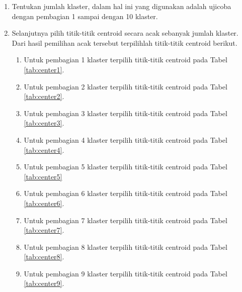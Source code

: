 \begin{enumerate}
	\item Tentukan jumlah klaster, dalam hal ini yang digunakan adalah ujicoba dengan pembagian 1 sampai dengan 10 klaster.
	\item Selanjutnya pilih titik-titik centroid secara acak sebanyak jumlah klaster. Dari hasil pemilihan acak tersebut terpilihlah titik-titik centroid berikut.
	
	\begin{enumerate}
	
	\item Untuk pembagian 1 klaster terpilih titik-titik centroid pada Tabel \ref{tab:center1}.
	


	\item Untuk pembagian 2 klaster terpilih titik-titik centroid pada Tabel \ref{tab:center2}.



	\item Untuk pembagian 3 klaster terpilih titik-titik centroid pada Tabel \ref{tab:center3}.
	


	\item Untuk pembagian 4 klaster terpilih titik-titik centroid pada Tabel \ref{tab:center4}.
	

	
	\item Untuk pembagian 5 klaster terpilih titik-titik centroid pada Tabel \ref{tab:center5}
	


	\item Untuk pembagian 6 klaster terpilih titik-titik centroid pada Tabel \ref{tab:center6}.
	


	\item Untuk pembagian 7 klaster terpilih titik-titik centroid pada Tabel \ref{tab:center7}.
	


	\item Untuk pembagian 8 klaster terpilih titik-titik centroid pada Tabel \ref{tab:center8}.



	\item Untuk pembagian 9 klaster terpilih titik-titik centroid pada Tabel \ref{tab:center9}.
	

\end{enumerate}
\end{enumerate}
